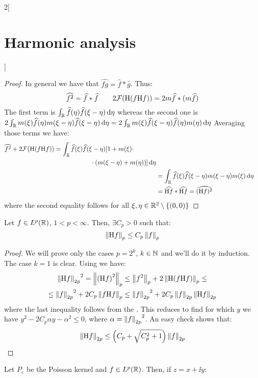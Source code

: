 \documentclass[../../../main_math.tex]{subfiles}
\begin{document}
\begin{multicols}{2}[\section{Harmonic analysis}]
\begin{proof}
    In general we have that $\widehat{fg}=\widehat{f}*\widehat{g}$. Thus:
    $$
      \widehat{f^2}= \widehat{f}*\widehat{f}\qquad
      2\mathcal{F}{(\mathrm{H}(f\mathrm{H} f))}=2m \widehat{f}*(m \widehat{f})
    $$
    The first term is $\int_{\mathbb{R}} \widehat{f}(\eta)\widehat{f}(\xi-\eta)\dd{\eta}$ whereas the second one is $2\int_{\mathbb{R}} m(\xi)\widehat{f}(\eta)m(\xi-\eta)\widehat{f}(\xi-\eta)\dd{\eta}=2\int_{\mathbb{R}} m(\xi)\widehat{f}(\xi-\eta)\widehat{f}(\eta)m(\eta)\dd{\eta}$
    Averaging those terms we have:
    \begin{align*}
      \begin{split}
        \widehat{f^2}+2\mathcal{F}{(\mathrm{H}(f\mathrm{H} f))} & =\int_{\mathbb{R}} \widehat{f}(\xi)\widehat{f}(\xi-\eta)[1+m(\xi)\cdot\\
          &\hspace{2cm}\cdot(m(\xi-\eta)+m(\eta))]\dd{\eta}
      \end{split} \\
       & =\int_{\mathbb{R}} \widehat{f}(\xi)\widehat{f}(\xi-\eta)m(\xi-\eta)m(\xi)\dd{\eta}                  \\
       & =\widehat{\mathrm{H} f}*\widehat{\mathrm{H} f}=\widehat{(\mathrm{H} f)^2}
    \end{align*}
    where the second equality follows for all $\xi,\eta\in\mathbb{R}^2\setminus\{(0,0)\}$
  \end{proof}
  \begin{theorem}
    Let $f\in L^p(\mathbb{R})$, $1<p<\infty$. Then, $\exists C_p>0$ such that:
    $$
      \left\|\mathrm{H} f\right\|_p \leq C_p \left\|f\right\|_p
    $$
  \end{theorem}
  \begin{proof}
    We will prove only the cases $p=2^k$, $k\in\mathbb{N}$ and we'll do it by induction. The case $k=1$ is clear. Using  we have:
    \begin{multline*}
      {\left\|\mathrm{H}f\right\|_{2p}}^2=\left\|{(\mathrm{H} f)}^2\right\|_p\leq \left\|f^2\right\|_p+2\left\|\mathrm{H}(f\mathrm{H} f)\right\|_p\leq\\\leq {\left\|f\right\|_{2p}}^2+2C_p\left\|f\mathrm{H} f\right\|_{p}\leq {\left\|f\right\|_{2p}}^2+2C_p\left\|f\right\|_{2p}\left\|\mathrm{H} f\right\|_{2p}
    \end{multline*}
    where the last inequality follows from the . This reduces to find for which $y$ we have $y^2 - 2C_p \alpha y - \alpha^2\leq 0$, where $\alpha={\left\|f\right\|_{2p}}^2$. An easy check shows that:
    $$
      \left\|\mathrm{H} f\right\|_{2p}\leq \left(C_p + \sqrt{C_p^2+1}\right)\left\|f\right\|_{2p}
    $$
  \end{proof}
  \begin{lemma}
    Let $P_\varepsilon$ be the Poisson kernel and $f\in L^p(\mathbb{R})$. Then, if $z=x+\ii y$:

\end{lemma}
\end{multicols}
\end{document}
